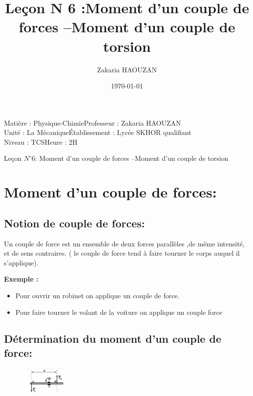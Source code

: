 \documentclass[12pt]{article}
\title{Leçon N 6 :Moment d'un couple de forces –Moment d'un couple de torsion }
\author{Zakaria HAOUZAN}
\date{\today}
\newcommand\headerMe[2]{\noindent{}#1\hfill#2}
\begin{document}
\headerMe{Matière : Physique-Chimie}{Professeur : Zakaria HAOUZAN}\\
\headerMe{Unité : La Mécanique}{Établissement : Lycée SKHOR qualifiant}\\
\headerMe{Niveau : TCS}{Heure : 2H}\\

\begin{center}
    \Large{Leçon $N^{\circ}6$: \color{red} Moment d'un couple de forces –Moment d'un couple de torsion }
\end{center}



\section{Moment d'un couple de forces: }

\subsection{Notion de couple de forces:}

Un couple de force est un ensemble de deux forces parallèles ,de même intensité, et de sens contraires. ( le couple
de force tend à faire tourner le corps auquel il s'applique).

\textbf{Exemple : }
\begin{itemize}

	\item Pour ouvrir un robinet on applique un couple de force.
\item Pour faire tourner le volant de la voiture
on applique un couple force
\end{itemize}


\subsection{Détermination du moment d'un couple de force: }

\begin{figure}
\includegraphics[width=0.2\textwidth]{./img/rotation.png}
\end{figure}
\end{document}
